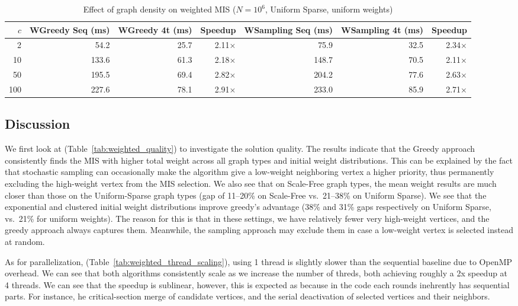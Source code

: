 \documentclass{article}
\begin{document}
\begin{table}[H]
    \centering
    \caption{Effect of graph density on weighted MIS ($N=10^6$, Uniform Sparse, uniform weights)}
    \label{tab:weighted_density}
    \footnotesize
    \begin{tabular}{r r r r r r r}
        \toprule
        $c$ & WGreedy Seq (ms) & WGreedy 4t (ms) & Speedup & WSampling Seq (ms) & WSampling 4t (ms) & Speedup \\
        \midrule
        2   & 54.2  & 25.7 & 2.11$\times$ & 75.9  & 32.5 & 2.34$\times$ \\
        10  & 133.6 & 61.3 & 2.18$\times$ & 148.7 & 70.5 & 2.11$\times$ \\
        50  & 195.5 & 69.4 & 2.82$\times$ & 204.2 & 77.6 & 2.63$\times$ \\
        100 & 227.6 & 78.1 & 2.91$\times$ & 233.0 & 85.9 & 2.71$\times$ \\
        \bottomrule
    \end{tabular}
\end{table}

\subsection{Discussion}

We first look at (Table~\ref{tab:weighted_quality}) to investigate the solution quality. The results indicate that the Greedy approach consistently finds the MIS with higher total weight across all graph types and initial weight distributions. This can be explained by the fact that stochastic sampling can occasionally make the algorithm give a low-weight neighboring vertex a higher priority, thus permanently excluding the high-weight vertex from the MIS selection.
We also see that on Scale-Free graph types, the mean weight results are much closer than those on the Uniform-Sparse graph types (gap of 11--20\% on Scale-Free vs.\ 21--38\% on Uniform Sparse).
We see that the exponential and clustered initial weight distributions improve greedy's advantage (38\% and 31\% gaps respectively on Uniform Sparse, vs.\ 21\% for uniform weights). The reason for this is that in these settings, we have relatively fewer very high-weight vertices, and the greedy approach always captures them. Meanwhile, the sampling approach may exclude them in case a low-weight vertex is selected instead at random.


As for parallelization,  (Table~\ref{tab:weighted_thread_scaling}), using 1 thread is slightly slower than the sequential baseline due to OpenMP overhead. We can see that both algorithms consistently scale as we increase the number of threds, both achieving roughly a 2x speedup at 4 threads. We can see that the speedup is sublinear, however, this is expected as because in the code each rounds inehrently has sequential parts. For instance, he critical-section merge of candidate vertices, and the serial deactivation of selected vertices and their neighbors.
\end{document}

